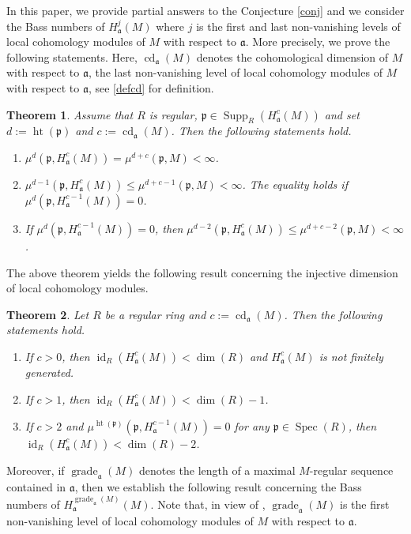\documentclass[12pt,twoside, final]{amsart}
\numberwithin{equation}{section}
\newtheorem{thm}{Theorem}[section]
\newtheorem{nota rem}[thm]{Notation and Remark}
\newtheorem{defen rem}[thm]{Definition and Remark}
\def\hei{\operatorname{ht}}
\def\Spec{\operatorname{Spec}}
\def\grade{\operatorname{grade}}
\def\cd{\operatorname{cd}}
\def\id{\operatorname{id}}
\def\Supp{\operatorname{Supp}}
\def\dim{\operatorname{dim}}
\newcommand{\p}{\mathfrak{p}}
\newcommand{\fa}{\mathfrak{a}}
\begin{document}
 In this paper, we provide partial answers to the Conjecture \ref{conj} and we consider the Bass numbers of $H^j_{\fa}(M)$
  where $j$ is the first and last non-vanishing levels of local cohomology modules of $M$ with respect to $\fa$. More precisely, we prove the following statements.
Here, $ \cd_{\fa}(M)$ denotes the cohomological dimension of $M$ with respect to $\fa$, the
last non-vanishing level of local cohomology modules of $M $ with respect to $\fa$, see \ref{defcd} for definition.
  \begin{thm}%
  Assume that $R$ is regular, $\p\in \Supp_R(H^c_{\fa}(M))$ and set $d:= \hei(\p)$ and $c:= \cd_{\fa}(M)$. Then the following statements hold.
    \begin{enumerate}
        \item $\mu^d(\p, H^c_{\fa}(M))= \mu^{d+ c}(\p, M)< \infty$.\label{d,c}
        \item $\mu^{d- 1}(\p, H^c_{\fa}(M))\leq  \mu^{d+ c- 1}(\p, M)< \infty$. The equality holds if $\mu^d(\p, H^{c- 1}_{\fa}(M))= 0$.\label{d-1,c}
        \item If $\mu^d(\p, H^{c- 1}_{\fa}(M))= 0$, then $\mu^{d- 2}(\p, H^c_{\fa}(M))\leq \mu^{d+ c- 2}(\p, M)< \infty$.\label{d,c-1}
         \end{enumerate}
 \end{thm}
 The above theorem yields the following result concerning the injective dimension of local cohomology modules.

 \begin{thm}%
     Let $R$ be a regular ring and  $c:= \cd_{\fa}(M)$. Then the following statements hold.
 \begin{enumerate}
       \item If $c> 0$, then $\id_{R}(H^c_{\fa}(M))< \dim(R)$ and $H^c_{\fa}(M)$ is not finitely generated.
        \item If $c> 1$, then $\id_{R}(H^c_{\fa}(M))< \dim(R)- 1$.
        \item If $c> 2$ and   $\mu^{\hei(\p)}(\p, H^{c- 1}_{\fa}(M))= 0$ for any $\p\in \Spec(R)$, then $\id_{R}(H^c_{\fa}(M))< \dim(R)- 2$.
 \end{enumerate}
     
 \end{thm}
Moreover, if $\grade_{\fa}(M)$ denotes the length of a maximal $M$-regular sequence contained in $\fa$, then we establish the following result concerning the Bass numbers  of $ H^{\grade_{\fa}(M)}_{\fa}(M)$. Note that, in view of \cite[Theorem 6. 2. 7]{bsh}, $\grade_{\fa}(M)$ is the first non-vanishing level of local cohomology modules of $M$ with respect to $\fa$. 
\end{document}
